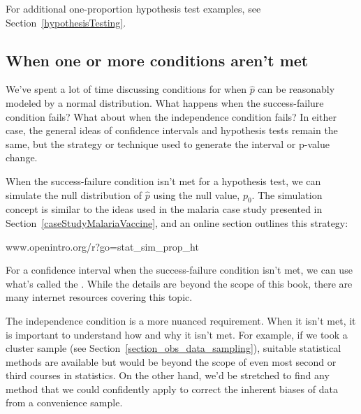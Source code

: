 \oneprophtsummary{}


\noindent%
For additional one-proportion hypothesis test examples,
see Section~\ref{hypothesisTesting}.




\D{\newpage}

\subsection{When one or more conditions aren't met}

We've spent a lot of time discussing conditions for when
$\hat{p}$ can be reasonably modeled by a normal distribution.
What happens when the success-failure condition fails?
What about when the independence condition fails?
In either case, the general ideas of confidence intervals
and hypothesis tests remain the same, but the strategy
or technique used to generate the interval or p-value
change.

When the success-failure condition isn't met
for a hypothesis test, we can simulate the null distribution
of $\hat{p}$ using the null value, $p_0$.
The simulation concept is similar to the ideas used
in the malaria case study presented in
Section~\ref{caseStudyMalariaVaccine},
and an online section outlines this strategy:
\begin{center}
    {www.openintro.org/r?go=stat\_sim\_prop\_ht}
\end{center}
For a confidence interval when the success-failure condition
isn't met, we can use what's called
the .
While the details are beyond the scope of this book,
there are many internet resources covering this topic.

The independence condition is a more nuanced requirement.
When it isn't met, it is important to understand how and why
it isn't met.
For example, if we took a cluster sample
(see Section~\ref{section_obs_data_sampling}),
suitable statistical methods are available but would
be beyond the scope of even most second or third courses
in statistics.
On the other hand, we'd be stretched to find any method
that we could confidently apply to correct the inherent biases
of data from a convenience sample.

